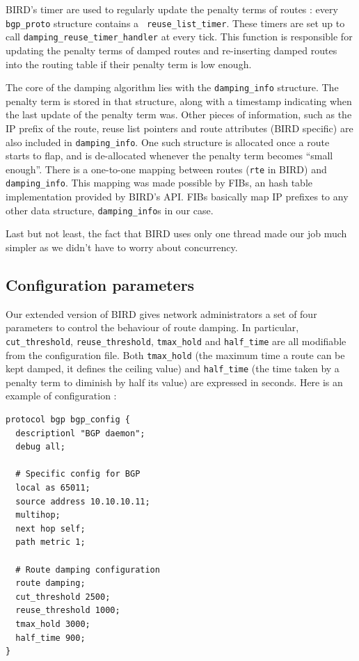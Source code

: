 \documentclass[a4paper,english]{IEEEtran}
\begin{document}
BIRD's timer are used to regularly update the penalty terms of routes : 
every \texttt{\small bgp\_proto} structure contains a \texttt{\small 
reuse\_list\_timer}.
These timers are set up to call \texttt{\small damping\_reuse\_timer\_handler} 
at every tick.
This function is responsible for updating the penalty terms of 
damped routes and re-inserting damped routes into the routing table if their
penalty term is low enough.

The core of the damping algorithm lies with the \texttt{\small damping\_info} 
structure. The penalty term is stored in that structure, 
along with a timestamp indicating when the last update of the penalty term was.
Other pieces of information, such as the IP prefix of the route, reuse list pointers 
and route attributes (BIRD specific) are also included in \texttt{\small damping\_info}.
One such structure is allocated once a route starts to flap, and is de-allocated 
whenever the penalty term becomes ``small enough''.
There is a one-to-one mapping between routes (\texttt{\small rte} in BIRD) 
and \texttt{\small damping\_info}. This mapping was made possible by FIBs, 
an hash table implementation provided by BIRD's API. FIBs basically map IP 
prefixes to any other data structure, {\tt\small damping\_info}s in our case.

Last but not least, the fact that BIRD uses only one thread made our job much 
simpler as we didn't have to worry about concurrency.

\subsection{Configuration parameters}

Our extended version of BIRD gives network administrators a set of four 
parameters to control the behaviour of route damping.
In particular, {\tt\small cut\_threshold}, {\tt\small reuse\_threshold},
{\tt\small tmax\_hold} and {\tt\small half\_time} are all modifiable
from the configuration file.
Both {\tt\small tmax\_hold} (the maximum time a route can be kept damped, 
it defines the ceiling value) and {\tt\small half\_time} (the time taken by
a penalty term to diminish by half its value) are expressed in seconds.
Here is an example of configuration :

\begin{verbatim}
protocol bgp bgp_config {
  descriptionl "BGP daemon";
  debug all;

  # Specific config for BGP
  local as 65011;
  source address 10.10.10.11;
  multihop;
  next hop self;
  path metric 1;
 
  # Route damping configuration
  route damping;
  cut_threshold 2500;
  reuse_threshold 1000;
  tmax_hold 3000;
  half_time 900;
}
\end{verbatim}
\end{document}
